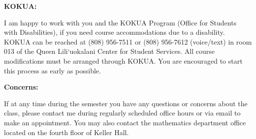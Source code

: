 \documentclass{article}
\begin{document}
{\bf KOKUA:} 

I am happy to work with you and the KOKUA Program (Office for Students with Disabilities), if you need course accommodations due to a disability.
KOKUA can be reached at (808) 956-7511 or (808) 956-7612 (voice/text) in room 013 of the Queen Lili`uokalani Center for Student Services.
All course modifications must be arranged through KOKUA. You are encouraged to start this process as early as possible.

\textbf{Concerns:}

If at any time during the semester you have any questions or concerns about the class, please contact me during regularly scheduled office hours or via email to make an appointment. You may also contact the mathematics department office located on the fourth floor of Keller Hall.
\end{document}
